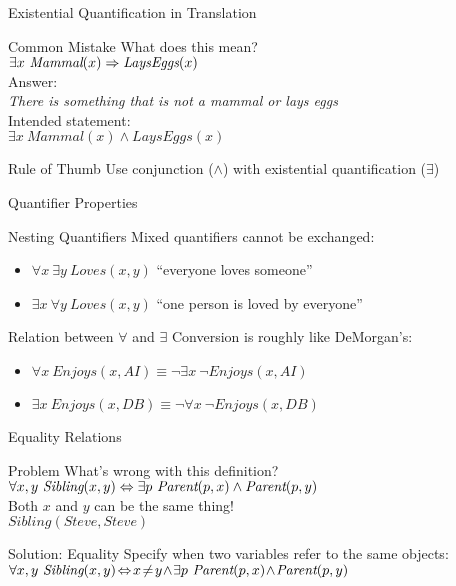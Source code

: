 \documentclass[14pt]{beamer}
\begin{document}
\begin{frame}{Existential Quantification in Translation}
	\begin{block}{Common Mistake}
		What does this mean? \\
		\tab$\exists x\ \textit{Mammal}(x) \Rightarrow \textit{LaysEggs}(x)$ \\
		\pause
		Answer: \\
		\tab\emph{There is something that is not a mammal or lays eggs} \\
		Intended statement: \\
		\tab$\exists x\ \textit{Mammal}(x) \land \textit{LaysEggs}(x)$ \\
	\end{block}
	\pause
	\begin{block}{Rule of Thumb}
		Use conjunction ($\land$) with existential quantification ($\exists$)
	\end{block}
\end{frame}
\begin{frame}{Quantifier Properties}
	\begin{block}{Nesting Quantifiers}
		Mixed quantifiers cannot be exchanged:
		\begin{itemize}
			\item $\forall x\ \exists y\ \textit{Loves}(x, y)$ ``everyone loves someone''
			\item $\exists x\ \forall y\ \textit{Loves}(x, y)$ ``one person is loved by everyone''
		\end{itemize}
	\end{block}
	\pause
	\begin{block}{Relation between $\forall$ and $\exists$}
		Conversion is roughly like DeMorgan's:
		\begin{itemize}
			\item $\forall x\ \textit{Enjoys}(x, \textit{AI}) \equiv \lnot\exists x\ \lnot \textit{Enjoys}(x, \textit{AI})$
			\item $\exists x\ \textit{Enjoys}(x, \textit{DB}) \equiv \lnot\forall x\ \lnot \textit{Enjoys}(x, \textit{DB})$
		\end{itemize}
	\end{block}
\end{frame}
\begin{frame}{Equality Relations}
	\begin{block}{Problem}
		What's wrong with this definition? \\
		\tab$\forall x, y\ \textit{Sibling}(x, y) \Leftrightarrow \exists p\ \textit{Parent}(p, x) \land \textit{Parent}(p, y)$ \\[1em]
		\pause
		Both $x$ and $y$ can be the same thing! \\
		\tab$\textit{Sibling}(\textit{Steve}, \textit{Steve})$
	\end{block}
	\pause
	\begin{block}{Solution: Equality}
		Specify when two variables refer to the same objects: \\[.5em]
		$\forall x, y\ \textit{Sibling}(x, y) \! \liff \! x \! \neq \! y \! \land \! \exists p\ \textit{Parent}(p, x) \! \land \! \textit{Parent}(p, y)$
	\end{block}
\end{frame}
\end{document}
